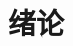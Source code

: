 \documentclass[master,winfonts]{njuthesis}
\begin{document}
%

\tableofcontents

\listoffigures

\listoftables

\mainmatter

\chapter{绪论}\label{chapter_introduction}
\end{document}
